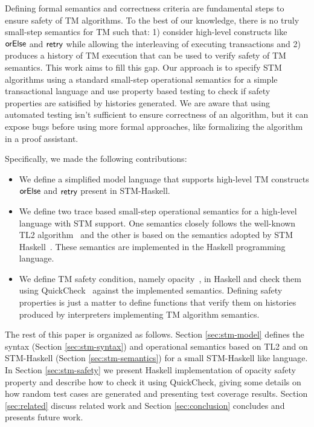 \documentclass[sigplan]{acmart}
\theoremstyle{definition}
\newcommand{\F}[1]{\green{\mathsf{#1}}}
\begin{document}
Defining formal semantics and correctness criteria are fundamental steps to ensure safety of TM algorithms.
To the best of our knowledge, there is no truly small-step semantics for TM such that: 1) consider high-level constructs like \ensuremath{\F{orElse}}
and \ensuremath{\F{retry}} while allowing the interleaving of executing transactions and 2) produces a history of TM execution that can be used to verify
safety of TM semantics. This work aims to fill this gap. Our approach is to specify STM algorithms
using a standard small-step operational semantics
for a simple transactional language and use property based testing to check if safety properties are satisified by histories generated.
We are aware that using automated testing isn't sufficient to ensure correctness of an algorithm, but
it can expose bugs before using more formal approaches, like formalizing the algorithm in a proof assistant.

Specifically, we made the following contributions:

\begin{itemize}
   \item We define a simplified model language that supports high-level TM constructs 
         \ensuremath{\F{orElse}} and \ensuremath{\F{retry}} present in STM-Haskell.
   \item We define two trace based small-step operational semantics for a high-level 
         language with STM support. One semantics closely follows the well-known TL2
         algorithm~\cite{Dice06} and the other is based on the semantics adopted by STM Haskell~\cite{Harris05}.
         These semantics are implemented in the Haskell programming language.
   \item We define TM safety condition, namely opacity~\cite{Guerraoui2008},
         in Haskell and check them using QuickCheck~\cite{Claessen00} against
         the implemented semantics. Defining safety properties is just a matter to define functions
         that verify them on histories produced by interpreters implementing TM algorithm
         semantics.
\end{itemize}

The rest of this paper is organized as follows.  Section \ref{sec:stm-model}
defines the syntax (Section \ref{sec:stm-syntax}) and operational semantics
based on TL2 and on STM-Haskell (Section \ref{sec:stm-semantics}) for a small STM-Haskell like language.
In Section \ref{sec:stm-safety}
we present Haskell implementation of opacity safety property and describe how to check it using
QuickCheck, giving some details on how random test cases are generated and presenting test coverage results.
Section \ref{sec:related} discuss related work and Section \ref{sec:conclusion} concludes and
presents future work.
\end{document}
